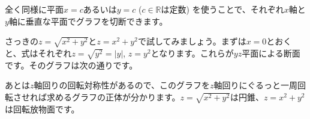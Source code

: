 全く同様に平面$x = c$あるいは$y = c$ ($c\in\mathbb{R}$は定数) を使うことで、それぞれ$x$軸と$y$軸に垂直な平面でグラフを切断できます。

さっきの$z = \sqrt{x^2+y^2}$と$z = x^2 + y^2$で試してみましょう。まずは$x=0$とおくと、式はそれぞれ$z = \sqrt{y^2} = |y|$, $z = y^2$となります。これらが$yz$平面による断面です。そのグラフは次の通りです。

\begin{figure}[h!tbp]
\centering
{} \quad
{}
\end{figure}

あとは$z$軸回りの回転対称性があるので、このグラフを$z$軸回りにぐるっと一周回転させれば求めるグラフの正体が分かります。$z = \sqrt{x^2 + y^2}$は円錐、$z = x^2 + y^2$は回転放物面です。

\begin{figure}[h!tbp]
\centering
{} \quad
{}
\end{figure}

